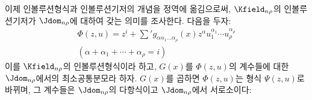 
이제 인볼루션형식과 인볼루션기저의 개념을 정역에 옮김으로써, $\Kfield_{n\rho}$의 인볼루션기저가 $\Jdom_{n\rho}$에 대하여 갖는 의미를 조사한다. 다음을 두자:
\[
\begin{gathered}
\Phi(z,u)=z^i+\sum{}' g_{\alpha\alpha_1\ldots\alpha_\rho}(x)z^\alpha u_1^{\alpha_1}\cdots u_\rho^{\alpha_\rho}\\
(\alpha+\alpha_1+\cdots+\alpha_\rho=i)
\end{gathered}
\]
이를 $\Kfield_{n\rho}$의 인볼루션형식이라 하고, $G(x)$를 $\Phi(z,u)$의 계수들에 대한 $\Jdom_{n\rho}$에서의 최소공통분모라 하자. $G(x)$를 곱하면 $\Phi(z,u)$는 형식 $\Psi(z,u)$로 바뀌며, 그 계수들은 $\Jdom_{n\rho}$의 다항식이고 $\Jdom_{n\rho}$에서 서로소이다:
